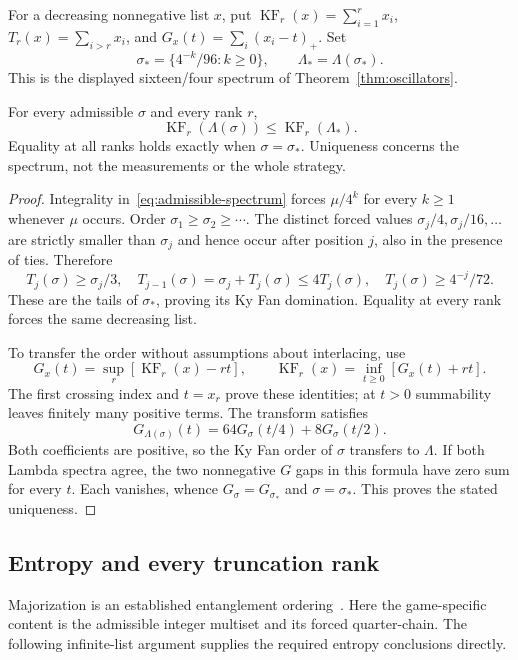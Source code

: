For a decreasing nonnegative list $x$, put $\operatorname{KF}_r(x)=\sum_{i=1}^r x_i$, $T_r(x)=\sum_{i>r}x_i$, and $G_x(t)=\sum_i(x_i-t)_+$. Set
\[
 \sigma_* =\{4^{-k}/96:k\ge0\},\qquad \Lambda_* =\Lambda(\sigma_*).
\]
This is the displayed sixteen/four spectrum of Theorem~\ref{thm:oscillators}.

\begin{theorem}\label{thm:majorization}
For every admissible $\sigma$ and every rank $r$,
\[
 \operatorname{KF}_r(\Lambda(\sigma))\le\operatorname{KF}_r(\Lambda_*).
\]
Equality at all ranks holds exactly when $\sigma=\sigma_*$. Uniqueness concerns the spectrum, not the measurements or the whole strategy.
\end{theorem}
\begin{proof}
Integrality in~\eqref{eq:admissible-spectrum} forces $\mu/4^k$ for every $k\ge1$ whenever $\mu$ occurs. Order $\sigma_1\ge\sigma_2\ge\cdots$. The distinct forced values $\sigma_j/4,\sigma_j/16,\ldots$ are strictly smaller than $\sigma_j$ and hence occur after position $j$, also in the presence of ties. Therefore
\[
 T_j(\sigma)\ge\sigma_j/3,\quad
 T_{j-1}(\sigma)=\sigma_j+T_j(\sigma)\le4T_j(\sigma),\quad
 T_j(\sigma)\ge4^{-j}/72.
\]
These are the tails of $\sigma_*$, proving its Ky Fan domination. Equality at every rank forces the same decreasing list.

To transfer the order without assumptions about interlacing, use
\[
 G_x(t)=\sup_r[\operatorname{KF}_r(x)-rt],\qquad
 \operatorname{KF}_r(x)=\inf_{t\ge0}[G_x(t)+rt].
\]
The first crossing index and $t=x_r$ prove these identities; at $t>0$ summability leaves finitely many positive terms. The transform satisfies
\[
 G_{\Lambda(\sigma)}(t)=64G_\sigma(t/4)+8G_\sigma(t/2).
\]
Both coefficients are positive, so the Ky Fan order of $\sigma$ transfers to $\Lambda$. If both Lambda spectra agree, the two nonnegative $G$ gaps in this formula have zero sum for every $t$. Each vanishes, whence $G_\sigma=G_{\sigma_*}$ and $\sigma=\sigma_*$. This proves the stated uniqueness.
\end{proof}

\subsection{Entropy and every truncation rank}\label{sec:optimal-entropies}
Majorization is an established entanglement ordering~\cite{Nielsen}. Here the game-specific content is the admissible integer multiset and its forced quarter-chain. The following infinite-list argument supplies the required entropy conclusions directly.

